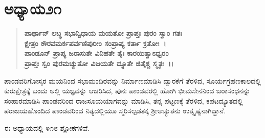 \section*{ಅಧ್ಯಾಯ\enginline{-}೨೧}

\begin{verse}
\textbf{ಪಾರ್ಥಾನ್ ಲಬ್ಧ ಸಭಾನ್ವಿಧಾಯ ಮಯತೋ ಪ್ರಾಪ್ತಃ ಪುರಂ ಸ್ವಾಂ ಗತಃ}\\\textbf{ಕ್ಷೇತ್ರಂ ಕೌರವಮರ್ಕಪರ್ವಣಿಪುರೀಂ ಸಂಪ್ರಾಪ್ಯ ಕರ್ತಾ ಕ್ರತೋಃ~।} \\\textbf{ಪಾಂಡೂನ್ ಪ್ರಾಪ್ಯ ಜರಾಸುತೇ ವಿನಿಹತೇ ತೈಃ ಕಾರಯಿತ್ವಾಽಧ್ವರಂ }\\\textbf{ಪ್ರಾಪ್ತಃ ಸ್ವಂ ಪುರಮಚ್ಯುತೋ ವಿಜಯತೇ ದ್ಯೂತೇ ಜಿತೈಶ್ಚ ಸ್ಮೃತಃ~।।}
\end{verse}

ಪಾಂಡವರಿಗೋಸ್ಕರ ಮಯನಿಂದ ಸಭಾಮಂದಿರವನ್ನು ನಿರ್ಮಾಣಮಾಡಿಸಿ ದ್ವಾರಕೆಗೆ ತೆರಳಿದ, ಸೂರ್ಯಗ್ರಹಣಕಾಲದಲ್ಲಿ ಕುರುಕ್ಷೇತ್ರಕ್ಕೆ ಬಂದು ಅಲ್ಲಿ ಯಜ್ಞವನ್ನು ಆಚರಿಸಿದ, ಪುನಃ ಪಾಂಡವರಲ್ಲಿ ಹೋಗಿ ಭೀಮಸೇನನಿಂದ ಜರಾಸಂಧನನ್ನು ಸಂಹಾರಮಾಡಿಸಿ ಪಾಂಡವ\-ರಿಂದ ರಾಜಸೂಯಯಾಗವನ್ನು ಮಾಡಿಸಿ, ತನ್ನ ಪಟ್ಟಣಕ್ಕೆ ತೆರಳಿದ, ಕಪಟದ್ಯೂತದಲ್ಲಿ ಪರಾ\-ಜಯಹೊಂದಿದ ಪಾಂಡವರಿಂದ ನಿತ್ಯದಲ್ಲಿಯೂ ಸ್ಮರಿಸಲ್ಪಡತಕ್ಕ ಶ‍್ರೀಅಚ್ಯುತನು ಉತ್ಕೃಷ್ಟನಾಗಿದ್ದಾನೆ.

ಈ ಅಧ್ಯಾಯದಲ್ಲಿ ೪೧೮ ಶ್ಲೋಕಗಳಿವೆ.

